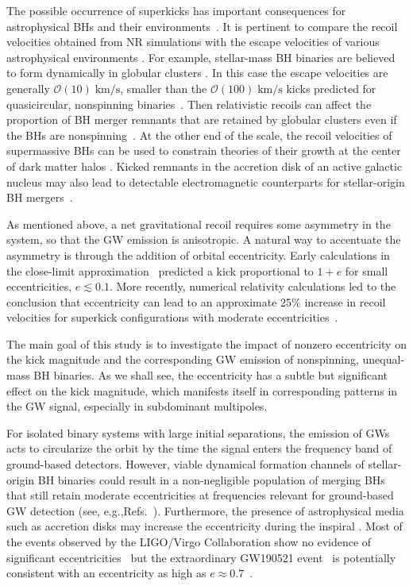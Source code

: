 The possible occurrence of superkicks has important consequences for
astrophysical BHs and their
environments~\cite{Komossa:2012cy,Colpi:2014poa,Blecha:2015baa,Barack:2018yly}.
It is pertinent to compare the recoil velocities obtained from NR
simulations with the escape velocities of various astrophysical
environments \cite{Merritt:2004xa}. For example, stellar-mass BH
binaries are believed to form dynamically in globular clusters
\cite{Benacquista:2011kv}. In this case the escape velocities are
generally $\mathcal{O}(10)\;\mathrm{km/s}$, smaller than the
$\mathcal{O}(100)\;\mathrm{km/s}$ kicks predicted for quasicircular,
nonspinning binaries~\cite{Gonzalez:2006md}. Then relativistic recoils
can affect the proportion of BH merger remnants that are retained by
globular clusters even if the BHs are
nonspinning~\cite{Morawski:2018kfs}. At the other end of the scale,
the recoil velocities of supermassive BHs can be used to constrain
theories of their growth at the center of dark matter halos
\cite{Haiman:2004ve}. Kicked remnants in the accretion disk of an
active galactic nucleus may also lead to detectable electromagnetic
counterparts for stellar-origin BH
mergers~\cite{Graham:2020gwr,Chen:2020gek}.

As mentioned above, a net gravitational recoil requires some asymmetry in the
system, so that the GW emission is anisotropic.
A natural way to
accentuate the asymmetry is through the addition of orbital
eccentricity. Early calculations in the close-limit
approximation~\cite{Sopuerta:2006et} predicted a kick proportional to
$1+e$ for small eccentricities, $e\lesssim 0.1$.  More recently,
numerical relativity calculations led to the conclusion that
eccentricity can lead to an approximate 25\% increase in recoil
velocities for superkick configurations with moderate
eccentricities~\cite{Sperhake:2019wwo}.

The main goal of this study is to investigate the impact of nonzero
eccentricity on the kick magnitude and the corresponding GW emission
of nonspinning, unequal-mass BH binaries.  As we shall see, the
eccentricity has a subtle but significant effect on the kick
magnitude, which manifests itself in corresponding patterns in the GW
signal, especially in subdominant multipoles.

For isolated binary systems with large initial separations, the
emission of GWs acts to circularize the orbit by the time the signal
enters the frequency band of ground-based detectors.  However, viable
dynamical formation channels of stellar-origin BH binaries could
result in a non-negligible population of merging BHs that still retain
moderate eccentricities at frequencies relevant for ground-based GW
detection (see,
e.g.,Refs.~\cite{Samsing:2017rat,Samsing:2017xmd,Samsing:2017oij,Rodriguez:2018pss,Samsing:2020tda,Tagawa:2020jnc}).
Furthermore, the presence of astrophysical media such as
accretion disks may increase the eccentricity during the inspiral
\cite{Cardoso:2020iji}.
Most of the events observed by the LIGO/Virgo Collaboration show no
evidence of significant eccentricities~\cite{Salemi:2019owp} but the
extraordinary GW190521 event~\cite{Abbott:2020tfl} is potentially
consistent with an eccentricity as high as
$e\approx0.7$~\cite{Romero-Shaw:2020thy,Gayathri:2020coq}.

